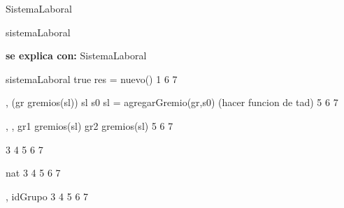 \begin{interfaz}{SistemaLaboral}
\begin{iparamformales}{sistemaLaboral}

\textbf{\large se explica con:} SistemaLaboral

\end{iparamformales}

{}{sistemaLaboral}
{true}
{res = nuevo(\emptyset)}
{1}
{6}
{7}

{, }{}
{ \lnot (gr \in gremios(sl)) \ly sl \igobs s0 }
{ sl = agregarGremio(gr,s0) (hacer funcion de tad) }
{5}
{6}
{7}

{, , }{}
{gr1 \in gremios(sl) \ly gr2 \in gremios(sl) }
{}
{5}
{6}
{7}

{3}
{4}
{5}
{6}
{7}

{}{nat}
{3}
{4}
{5}
{6}
{7}

{, }{idGrupo}
{3}
{4}
{5}
{6}
{7}

\end{interfaz}